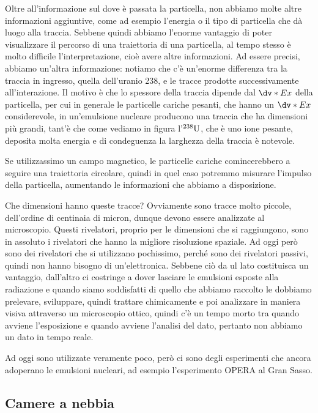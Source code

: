 Oltre all'informazione sul dove è passata la particella, non abbiamo molte altre informazioni aggiuntive, come ad esempio l'energia o il tipo di particella che dà luogo alla traccia. Sebbene quindi abbiamo l'enorme vantaggio di poter visualizzare il percorso di una traiettoria di una particella, al tempo stesso è molto difficile l'interpretazione, cioè avere altre informazioni. Ad essere precisi, abbiamo un'altra informazione: notiamo che c'è un'enorme differenza tra la traccia in ingresso, quella dell'uranio 238, e le tracce prodotte successivamente all'interazione. Il motivo è che lo spessore della traccia dipende dal $\dv*{E}{x}$ della particella, per cui in generale le particelle cariche pesanti, che hanno un $\dv*{E}{x}$ considerevole, in un'emulsione nucleare producono una traccia che ha dimensioni più grandi, tant'è che come vediamo in figura l'$\rm ^{238}U$, che è uno ione pesante, deposita molta energia e di condeguenza la larghezza della traccia è notevole.

Se utilizzassimo un campo magnetico, le particelle cariche comincerebbero a seguire una traiettoria circolare, quindi in quel caso potremmo misurare l'impulso della particella, aumentando le informazioni che abbiamo a disposizione.

Che dimensioni hanno queste tracce? Ovviamente sono tracce molto piccole, dell'ordine di centinaia di micron, dunque devono essere analizzate al microscopio. Questi rivelatori, proprio per le dimensioni che si raggiungono, sono in assoluto i rivelatori che hanno la migliore risoluzione spaziale. Ad oggi però sono dei rivelatori che si utilizzano pochissimo, perché sono dei rivelatori passivi, quindi non hanno bisogno di un'elettronica. Sebbene ciò da ul lato costituisca un vantaggio, dall'altro ci costringe a dover lasciare le emulsioni esposte alla radiazione e quando siamo soddisfatti di quello che abbiamo raccolto le dobbiamo prelevare, sviluppare, quindi trattare chimicamente e poi analizzare in maniera visiva attraverso un microscopio ottico, quindi c'è un tempo morto tra quando avviene l'esposizione e quando avviene l'analisi del dato, pertanto non abbiamo un dato in tempo reale.

Ad oggi sono utilizzate veramente poco, però ci sono degli esperimenti che ancora adoperano le emulsioni nucleari, ad esempio l'esperimento OPERA al Gran Sasso.

\subsection{Camere a nebbia}

